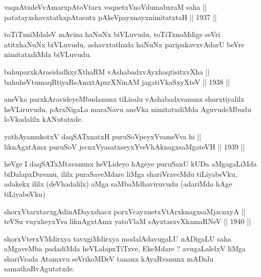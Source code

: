 \begin{shl}
vaqnAtxdeVvA\s \s marxpAtoV\s tarx vaqnetxVnoVdumabxraM saha ||  \\
patatayxshavxtathxpAtasutx pAkeV\s payxnayxnimitatxtaH ||  1937 ||  
\end{shl}

\begin{artha}
toTiTxniMdaleV mAvina haNuNx biVLuvudu, toTiTxnoMdige seVri atitxhaNuNx
biVLuvudu, ashavxtathxda haNuNx paripakavxvAdarU beVre nimitatxdiMda
biVLuvudu.
\end{artha}

\begin{shl}
bahuparxkArasidadhxyXthaRM vAshabadxvAyxhaqtisitxvXha ||  \\
bahuheVtumaqRtiyaRsAmxtApxrXNinAM jagatiVkaSxyXteV ||  1938 ||  
\end{shl}

\begin{artha}
aneVka parxkAravideyeMbudanunx tiLisalu vAshabadxvanunx shurxtiyalilx
heVLiruvudu, pArxNigaLa maraNavu aneVka nimitatxdiMda AguvudeMbudu
loVkadalilx kANutatxde.
\end{artha}

\begin{shl}
yathA\s yamukotxV daqSATxnatxH puruSoV\s peyxVvameVva hi ||  \\
liknAgxtAmx puruSoV jecnxVyasatxseyxYveVhAknagxsaMgateVH ||  1939 ||  
\end{shl}

\begin{artha}
heVge I daqSATxMtavanunx heVLideyo hAgeye puruSanU kUDa aMgagaLiMda
biDalapxDuvanu, ililx puraSaveMdare liMga shariVraveMdu tiLiyabeVku,
adakekx ililx (deVhadalilx) aMga saMbaMdhaviruvudu (adariMda hAge tiLiyabeVku)
\end{artha}


\begin{shl}
shorxVtarxtavxgAdinADayxshacx porxVcayxnetxV\s tArxknagxsaMjacnxyA || \\
teVSu vuyxheyxYva liknAgxtAmx yatoV\s laM sAyxtasxvXkamaRNeV ||  1940 ||  
\end{shl}

\begin{artha}
shorxVterxVMdirxya tavxgiMdirxya modalAdavugaLU nADigaLU saha aMgaveMba
padadiMda heVLalapxTiTxve, EkeMdare ? avugaLalelxV liMga shariVrada
Atamxvu seVrikoMDeV tananx kAyaRvanunx mADalu samathaRvAgutatxde.
\end{artha}

